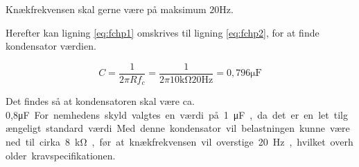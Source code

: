 Knækfrekvensen skal gerne være på maksimum $20\si{\hertz}$.

Herefter kan ligning \ref{eq:fchp1} omskrives til ligning \ref{eq:fchp2}, for at finde kondensator værdien.

\begin{equation}
	C = \frac{1}{2\pi Rf_c} = \frac{1}{2\pi 10\si{\kilo\ohm} 20\si{\hertz}} = 0,796\si{\micro\farad}
\label{eq:fchp2}
\end{equation}

Det findes så at kondensatoren skal være ca. 0,8\si\micro\farad.
For nemhedens skyld valgtes en værdi på 1\si\micro\farad, da det er en let tilgængeligt standard værdi.
Med denne kondensator vil belastningen kunne være ned til cirka 8\si\kilo\ohm, før at knækfrekvensen vil overstige 20\si\hertz, hvilket overholder kravspecifikationen.




